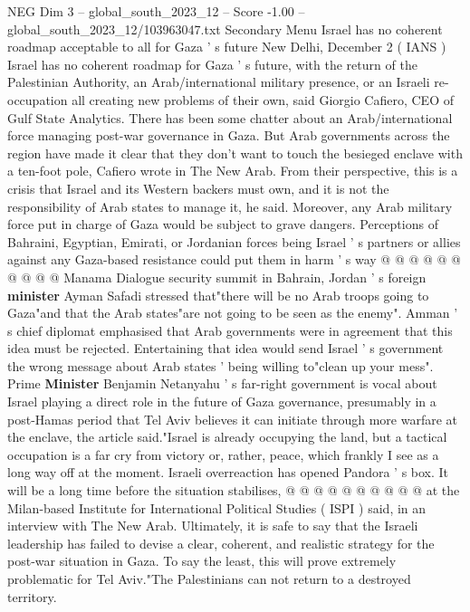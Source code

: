 \begin{textsample}{NEG Dim 3 – global\_south\_2023\_12 – Score -1.00 – global\_south\_2023\_12/103963047.txt}  \label{ex:f3_neg_038}
Secondary Menu Israel has no coherent roadmap acceptable to all for Gaza ' s future New Delhi, December 2 ( IANS ) Israel has no coherent roadmap for Gaza ' s future, with the return of the Palestinian Authority, an Arab/international military presence, or an Israeli re-occupation all creating new problems of their own, said Giorgio Cafiero, CEO of Gulf State Analytics.
There has been some chatter about an Arab/international force managing post-war governance in Gaza.
But Arab governments across the region have made it clear that they don't want to touch the besieged enclave with a ten-foot pole, Cafiero wrote in The New Arab.
From their perspective, this is a crisis that Israel and its Western backers must own, and it is not the responsibility of Arab states to manage it, he said.
Moreover, any Arab military force put in charge of Gaza would be subject to grave dangers.
Perceptions of Bahraini, Egyptian, Emirati, or Jordanian forces being Israel ' s partners or allies against any Gaza-based resistance could put them in harm ' s way @ @ @ @ @ @ @ @ @ @ Manama Dialogue security summit in Bahrain, Jordan ' s foreign \textbf{minister} Ayman Safadi stressed that"there will be no Arab troops going to Gaza"and that the Arab states"are not going to be seen as the enemy".
Amman ' s chief diplomat emphasised that Arab governments were in agreement that this idea must be rejected.
Entertaining that idea would send Israel ' s government the wrong message about Arab states ' being willing to"clean up your mess".
Prime \textbf{Minister} Benjamin Netanyahu ' s far-right government is vocal about Israel playing a direct role in the future of Gaza governance, presumably in a post-Hamas period that Tel Aviv believes it can initiate through more warfare at the enclave, the article said."Israel is already occupying the land, but a tactical occupation is a far cry from victory or, rather, peace, which frankly I see as a long way off at the moment.
Israeli overreaction has opened Pandora ' s box.
It will be a long time before the situation stabilises, @ @ @ @ @ @ @ @ @ @ at the Milan-based Institute for International Political Studies ( ISPI ) said, in an interview with The New Arab.
Ultimately, it is safe to say that the Israeli leadership has failed to devise a clear, coherent, and realistic strategy for the post-war situation in Gaza.
To say the least, this will prove extremely problematic for Tel Aviv."The Palestinians can not return to a destroyed territory.

\end{textsample}
